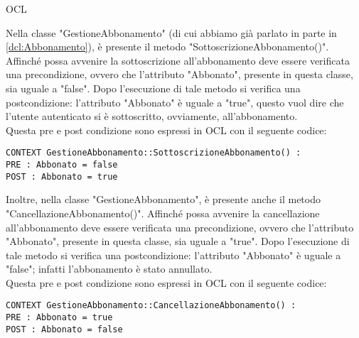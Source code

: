 \begin{listaPersonale}{OCL}
    \begin{center}
        
    \end{center}
    Nella classe "GestioneAbbonamento" (di cui abbiamo già parlato in parte in \ref{dcl:Abbonamento}), è presente il metodo "SottoscrizioneAbbonamento()". Affinché possa avvenire la sottoscrizione all'abbonamento deve essere verificata una precondizione, ovvero che l'attributo "Abbonato", presente in questa classe, sia uguale a "false". Dopo l'esecuzione di tale metodo si verifica una postcondizione: l'attributo "Abbonato" è uguale a "true", questo vuol dire che l'utente autenticato si è sottoscritto, ovviamente, all'abbonamento.\\
    Questa pre e post condizione sono espressi in OCL con il seguente codice:
    \begin{lstlisting}
CONTEXT GestioneAbbonamento::SottoscrizioneAbbonamento() :
PRE : Abbonato = false
POST : Abbonato = true
    \end{lstlisting}
    Inoltre, nella classe "GestioneAbbonamento", è presente anche il metodo "CancellazioneAbbonamento()". Affinché possa avvenire la cancellazione all'abbonamento deve essere verificata una precondizione, ovvero che l'attributo "Abbonato", presente in questa classe, sia uguale a "true". Dopo l'esecuzione di tale metodo si verifica una postcondizione: l'attributo "Abbonato" è uguale a "false"; infatti l'abbonamento è stato annullato.\\
    Questa pre e post condizione sono espressi in OCL con il seguente codice:
    \begin{lstlisting}
CONTEXT GestioneAbbonamento::CancellazioneAbbonamento() :
PRE : Abbonato = true
POST : Abbonato = false
    \end{lstlisting}





\end{listaPersonale}
